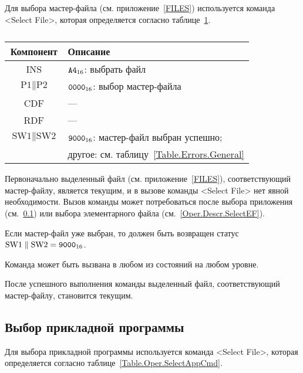 Для выбора мастер-файла (см. приложение~\ref{FILES}) 
используется команда <Select File>, 
которая определяется согласно 
таблице~\ref{Table.Oper.SelectMFCmd}.

\begin{table}[hbt]
\caption{}\label{Table.Oper.SelectMFCmd}
\begin{tabular}{|c|p{14cm}|}
\hline
Компонент & Описание \\
\hline
\hline
INS & $\texttt{A4}_{16}$: выбрать файл\\ 
\hline
$\text{P1} \parallel \text{P2}$ & $\texttt{0000}_{16}$: выбор мастер-файла\\
\hline
CDF & --- \\
\hline 
RDF &  --- \\
\hline
$\text{SW1}\parallel\text{SW2}$ & 
$\texttt{9000}_{16}$: мастер-файл выбран успешно; \\
  & другое: см. таблицу~\ref{Table.Errors.General} \\
\hline
\end{tabular}
\end{table}

Первоначально выделенный файл (см. приложение~\ref{FILES}), 
соответствующий мастер-файлу, является текущим,
и в вызове команды <Select File> нет явной необходимости. 
Вызов команды может потребоваться после 
выбора приложения (см.~\ref{Oper.Descr.SelectApp})
или выбора элементарного файла (см.~\ref{Oper.Descr.SelectEF}). 

Если мастер-файл уже выбран, то должен быть возвращен 
статус $\text{SW1} \parallel \text{SW2} = \texttt{9000}_{16}$.

Команда может быть вызвана в любом из состояний на 
любом уровне.

После успешного выполнения команды выделенный файл, 
соответствующий мастер-файлу, становится текущим.


\subsection{Выбор прикладной программы}
\label{Oper.Descr.SelectApp}

Для выбора прикладной программы используется 
команда <Select File>, 
которая определяется согласно 
таблице~\ref{Table.Oper.SelectAppCmd}.

